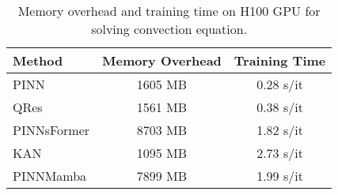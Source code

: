 \begin{table}[H]
\vspace{-3mm}
  \caption{Memory overhead and training time on H100 GPU for solving convection equation. }
  
  \centering
    \small
  \begin{tabular}{lcc}

    \toprule 
    Method & Memory Overhead & Training Time\\
   \midrule
   PINN & 1605 MB & 0.28 s/it \\
   QRes & 1561 MB& 0.38 s/it \\
   PINNsFormer & 8703 MB & 1.82 s/it\\
   KAN & 1095 MB & 2.73 s/it\\
    \midrule
    PINNMamba & 7899 MB & 1.99 s/it\\

   

    \bottomrule
  \end{tabular}
  \normalsize
  \label{tab:training}

\end{table}
